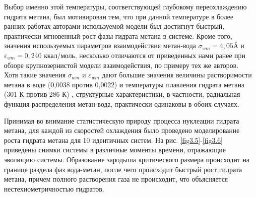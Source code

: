 Выбор именно этой температуры, соответствующей глубокому переохлаждению гидрата метана, был мотивирован тем, что при данной температуре в более ранних работах авторами используемой модели был достигнут быстрый, практически мгновенный рост фазы гидрата метана в системе. Кроме того, значения используемых параметров взаимодействия метан-вода $\sigma_{wm}=4,05 \si{\angstrom}$ и $\varepsilon_{wm}=0,240$ ккал/моль, несколько отличаются от приведенных нами ранее при обзоре крупнозернистой модели взаимодействия, по примеру тех же авторов. Хотя такие значения $\sigma_{wm}$ и $\varepsilon_{wm}$ дают большие значения величины растворимости метана в воде (0,0038 против 0,0022) и температуры плавления гидрата метана (301 К против 286 К) , структурные характеристики, в частности, радиальная функция распределения метан-вода, практически одинаковы в обоих случаях.

Принимая во внимание статистическую природу процесса нуклеации гидрата метана, для каждой из скоростей охлаждения было проведено моделирование роста гидрата метана для 10 идентичных систем. На рис. \ref{fig3.5}-\ref{fig3.6} приведены снимки системы в различные моменты времени, отражающие эволюцию системы. Образование зародыша критического размера происходит на границе раздела фаз вода-метан, после чего происходит быстрый рост гидрата метана, причем полного растворения газа не происходит, что объясняется нестехиометричностью гидратов.


